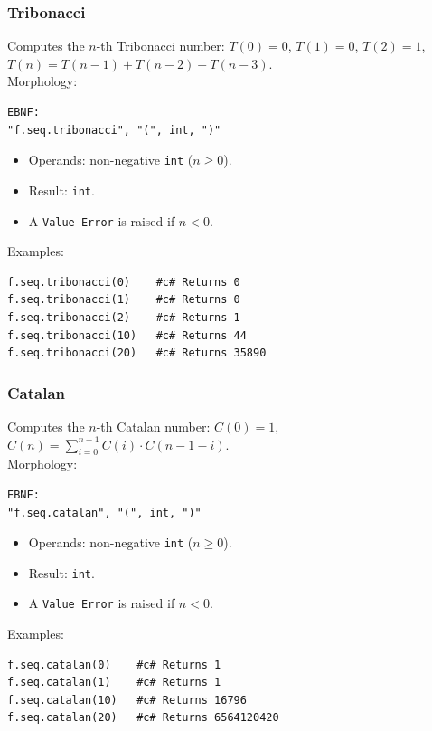 \subsubsection{Tribonacci}
Computes the $n$-th Tribonacci number: $T(0) = 0$, $T(1) = 0$, $T(2) = 1$, $T(n) = T(n-1) + T(n-2) + T(n-3)$.\\
Morphology:
\begin{verbatim}
EBNF:
"f.seq.tribonacci", "(", int, ")"
\end{verbatim}
\begin{itemize}
\item Operands: non-negative \texttt{int} ($n \geq 0$).
\item Result: \texttt{int}.
\item A \texttt{Value Error} is raised if $n < 0$.
\end{itemize}
Examples:
\begin{verbatim}
f.seq.tribonacci(0)    #c# Returns 0
f.seq.tribonacci(1)    #c# Returns 0
f.seq.tribonacci(2)    #c# Returns 1
f.seq.tribonacci(10)   #c# Returns 44
f.seq.tribonacci(20)   #c# Returns 35890
\end{verbatim}

\subsubsection{Catalan}
Computes the $n$-th Catalan number: $C(0) = 1$, $C(n) = \sum_{i=0}^{n-1} C(i) \cdot C(n-1-i)$.\\
Morphology:
\begin{verbatim}
EBNF:
"f.seq.catalan", "(", int, ")"
\end{verbatim}
\begin{itemize}
\item Operands: non-negative \texttt{int} ($n \geq 0$).
\item Result: \texttt{int}.
\item A \texttt{Value Error} is raised if $n < 0$.
\end{itemize}
Examples:
\begin{verbatim}
f.seq.catalan(0)    #c# Returns 1
f.seq.catalan(1)    #c# Returns 1
f.seq.catalan(10)   #c# Returns 16796
f.seq.catalan(20)   #c# Returns 6564120420
\end{verbatim}

